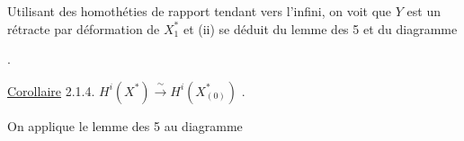 Utilisant des homothéties de rapport tendant vers l'infini, on voit que $Y$ est un rétracte par déformation de $X_1^*$ et (ii) se déduit du lemme des 5 et du diagramme

\begin{center}
\quad .
\end{center}
\underline{Corollaire} 2.1.4. \qquad $H^i(X^*) \xrightarrow{\ \sim\ } H^i(X^*_{(0)})$ .

On applique le lemme des 5 au diagramme

